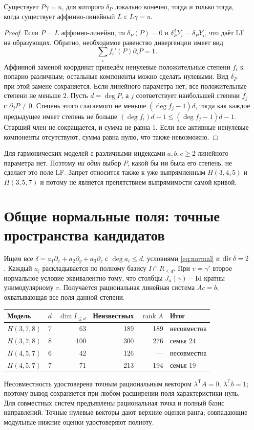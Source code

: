 \begin{theorem}
Существует $P\gamma=u$, для которого $\delta_P$ локально конечно,
тогда и только тогда, когда существует аффинно-линейный $L$ с
$L\gamma=u$.
\end{theorem}
\begin{proof}
Если $P=L$ аффинно-линейно, то $\delta_P(P)=0$ и
$\delta_P^2Y_i=\delta_PY_i$, что даёт LF на образующих.
Обратно, необходимое равенство дивергенции имеет вид
\[
\sum_i f_i'(P)\partial_iP=1.
\]
Аффинной заменой координат приведём ненулевые положительные степени
$f_i$ к попарно различным; остальные компоненты можно сделать нулевыми.
Вид $\delta_P$ при этой замене сохраняется. Если линейного параметра
нет, все положительные степени не меньше $2$.
Пусть $d=\deg P$, а $j$ соответствует наибольшей степени $f_j$
с $\partial_jP\ne0$. Степень этого слагаемого не меньше
$(\deg f_j-1)d$, тогда как каждое предыдущее имеет степень не больше
$(\deg f_i)d-1\le(\deg f_j-1)d-1$.
Старший член не сокращается, и сумма не равна $1$.
Если все активные ненулевые компоненты отсутствуют, сумма равна нулю,
что также невозможно.
\end{proof}

Для гармонических моделей с различными индексами $a,b,c\ge2$
линейного параметра нет. Поэтому \emph{ни один} выбор $P$, какой бы
ни была его степень, не сделает это поле LF. Запрет относится также
к уже выпрямленным $H(3,4,5)$ и $H(3,5,7)$ и потому не является
препятствием выпрямимости самой кривой.

\section{Общие нормальные поля: точные пространства кандидатов}
Ищем все $\delta=a_1\partial_x+a_2\partial_y+a_3\partial_z$ с
$\deg a_i\le d$, условиями \eqref{eq:normal} и $\operatorname{div}\delta=2$.
Каждый $a_i$ раскладывается по полному базису $I\cap R_{\le d}$.
При $v=\gamma'$ второе нормальное условие эквивалентно тому, что
столбцы $J_a(\gamma)-\mathrm{Id}$ кратны унимодулярному $v$.
Получается рациональная линейная система $Ac=b$, охватывающая
все поля данной степени.

\begin{center}\small
\begin{tabular}{@{}lrrrrl@{}}\toprule
Модель & $d$ & $\dim I_{\le d}$ & Неизвестных & $\operatorname{rank}A$ & Итог\\\midrule
$H(3,7,8)$ &7&63&189&189&несовместна\\
$H(3,7,8)$ &8&100&300&276&семья $24$\\
$H(4,5,7)$ &6&42&126&---&несовместна\\
$H(4,5,7)$ &7&71&213&194&семья $19$\\\bottomrule
\end{tabular}
\end{center}
Несовместность удостоверена точным рациональным вектором
$\lambda^{\mathsf T}A=0$, $\lambda^{\mathsf T}b=1$; поэтому вывод
сохраняется при любом расширении поля характеристики нуль.
Для совместных систем предъявлены рациональная точка и полный базис
направлений. Точные нулевые векторы дают верхние оценки ранга;
совпадающие модульные нижние оценки удостоверяют полноту.

